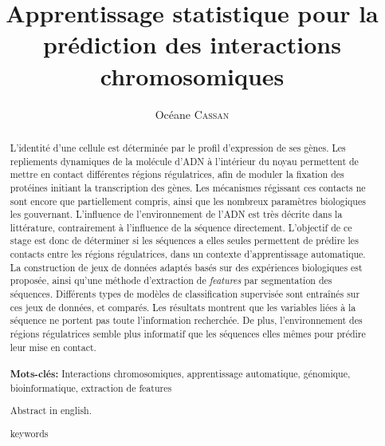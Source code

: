 \documentclass[french]{llncs}
\title{Apprentissage statistique pour la prédiction des interactions chromosomiques}
\author{ Océane \textsc{Cassan} 
\newline{}{Encadrée par Laurent \textsc{Bréhélin}, Charles-Henri \textsc{Lecellier}, Sophie \textsc{Lèbre}}}
\institute{Université Claude Bernard Lyon 1\\
INSA de Lyon, France}
\providecommand{\motcles}[1]{\textbf{Mots-clés:} #1}
\begin{document}
\clearpage\thispagestyle{empty}\addtocounter{page}{-1} 

    \renewcommand{\thelstlisting}{\arabic{lstlisting}}

    \maketitle

    \begin{abstract} L'identité d'une cellule est déterminée par le profil d'expression de ses gènes. Les repliements dynamiques de la molécule d'ADN à l'intérieur du noyau permettent de mettre en contact différentes régions régulatrices, afin de moduler la fixation des protéines initiant la transcription des gènes. Les mécanismes régissant ces contacts ne sont encore que partiellement compris, ainsi que les nombreux paramètres biologiques les gouvernant. L'influence de l'environnement de l'ADN est très décrite dans la littérature, contrairement à l'influence de la séquence directement. L'objectif de ce stage est donc de déterminer si les séquences a elles seules permettent de prédire les contacts entre les régions régulatrices, dans un contexte d'apprentissage automatique. La construction de jeux de données adaptés basés sur des expériences biologiques est proposée, ainsi qu'une méthode d'extraction de \textit{features} par segmentation des séquences. Différents types de modèles de classification supervisée sont entraînés sur ces jeux de données, et comparés. Les résultats montrent que les variables liées à la séquence ne portent pas toute l'information recherchée. De plus, l'environnement des régions régulatrices semble plus informatif que les séquences elles mêmes pour prédire leur mise en contact.
\\
         \\
        
         \motcles{ 
        Interactions chromosomiques, apprentissage automatique, génomique, bioinformatique, extraction de features
    }
    \end{abstract}

   
    \clearpage\thispagestyle{empty}\addtocounter{page}{-1} 
    
    
    \begin{abstract}
        Abstract in english.
        
         \begin{keywords}
        keywords
    \end{keywords}
    \end{abstract}
\end{document}
